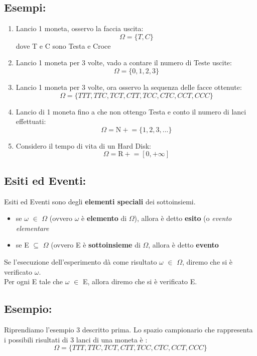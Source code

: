 \documentclass{report}
\begin{document}
\subsection{Esempi:}
\begin{enumerate}
    \item Lancio 1 moneta, osservo la faccia uscita: 
    \[\Omega = \{T,C\}\] dove T e C sono Testa e Croce
    \item Lancio 1 moneta per 3 volte, vado a contare il numero di Teste uscite: 
    \[\Omega = \{0, 1, 2, 3\}\]
    \item Lancio 1 moneta per 3 volte, ora osservo la sequenza delle facce ottenute:
    \[\Omega = \{TTT, TTC, TCT, CTT, TCC, CTC, CCT, CCC\}\]
    \item Lancio di 1 moneta fino a che non ottengo Testa e conto il numero di lanci effettuati: 
    \[\Omega = \mathrm{N+} = \{1, 2, 3, ...\}\]
    \item Considero il tempo di vita di un Hard Disk:
    \[\Omega = \mathrm{R+} = [0, +\infty]\]
\end{enumerate}
\subsection{Esiti ed Eventi:}
Esiti ed Eventi sono degli \textbf{elementi speciali} dei sottoinsiemi.
\begin{itemize}
    \item se \(\omega\) \(\in\) \(\Omega\) (ovvero \(\omega\) è \textbf{elemento} di \(\Omega\)), allora è detto \textbf{esito} (o \textit{evento elementare}
    \item se E \(\subseteq\) \(\Omega\) (ovvero E è \textbf{sottoinsieme} di \(\Omega\), allora è detto \textbf{evento} 
\end{itemize}

Se l'esecuzione dell'esperimento dà come risultato \(\omega\) \(\in\) \(\Omega\), diremo che si è verificato \(\omega\). \\

Per ogni E tale che \(\omega\) \(\in\) E, allora diremo che si è verificato E.

\subsection{Esempio:}
Riprendiamo l'esempio 3 descritto prima. Lo spazio campionario che rappresenta i possibili risultati di 3 lanci di una moneta è : \[\Omega = \{TTT, TTC, TCT, CTT, TCC, CTC, CCT, CCC\}\]
\end{document}
